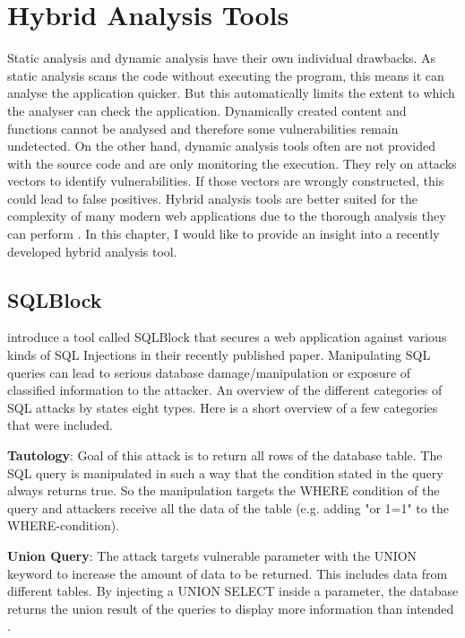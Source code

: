 \section{Hybrid Analysis Tools}
Static analysis and dynamic analysis have their own individual drawbacks. As static analysis scans the code without executing the program, this means it can analyse the application quicker. But this automatically limits the extent to which the analyser can check the application. Dynamically created content and functions cannot be analysed and therefore some vulnerabilities remain undetected. On the other hand, dynamic analysis tools often are not provided with the source code and are only monitoring the execution. They rely on attacks vectors to identify vulnerabilities. If those vectors are wrongly constructed, this could lead to false positives.
Hybrid analysis tools are better suited for the complexity of many modern web applications due to the thorough analysis they can perform \autocite[]{Araujo2018, Jahanshahi2018}. In this chapter, I would like to provide an insight into a recently developed hybrid analysis tool.\newline


\subsection{SQLBlock}

\textcite[]{Jahanshahi2018} introduce a tool called SQLBlock that secures a web application against various kinds of SQL Injections in their recently published paper. Manipulating SQL queries can lead to serious database damage/manipulation or exposure of classified information to the attacker. An overview of the different categories of SQL attacks by \textcite[3ff.]{Halfond2008} states eight types. Here is a short overview of a few categories that were included.\newline


\textbf{Tautology}: Goal of this attack is to return all rows of the database table. The SQL query is manipulated in such a way that the condition stated in the query always returns true. So the manipulation targets the WHERE condition of the query and attackers receive all the data of the table (e.g. adding "or 1=1" to the WHERE-condition)\autocite[3]{Halfond2008}.\newline


\textbf{Union Query}: The attack targets vulnerable parameter with the UNION keyword to increase the amount of data to be returned. This includes data from different tables. By injecting a UNION SELECT inside a parameter, the database returns the union result of the queries to display more information than intended \autocite[4]{Halfond2008}.\newline


